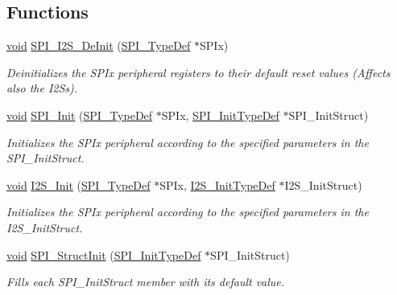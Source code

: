 \subsection*{Functions}
\begin{DoxyCompactItemize}
\item 
\hyperlink{usb__devapi_8h_afabf60e7f57651d6d595a02c75f07cd0}{void} \hyperlink{group___s_p_i___exported___functions_gabe36880945fa56785283a9c0092124cc}{S\+P\+I\+\_\+\+I2\+S\+\_\+\+De\+Init} (\hyperlink{struct_s_p_i___type_def}{S\+P\+I\+\_\+\+Type\+Def} $\ast$S\+P\+Ix)
\begin{DoxyCompactList}\small\item\em Deinitializes the S\+P\+Ix peripheral registers to their default reset values (Affects also the I2\+Ss). \end{DoxyCompactList}\item 
\hyperlink{usb__devapi_8h_afabf60e7f57651d6d595a02c75f07cd0}{void} \hyperlink{group___s_p_i___exported___functions_ga8dacc1dc48bf08c0f12da409f4889037}{S\+P\+I\+\_\+\+Init} (\hyperlink{struct_s_p_i___type_def}{S\+P\+I\+\_\+\+Type\+Def} $\ast$S\+P\+Ix, \hyperlink{struct_s_p_i___init_type_def}{S\+P\+I\+\_\+\+Init\+Type\+Def} $\ast$S\+P\+I\+\_\+\+Init\+Struct)
\begin{DoxyCompactList}\small\item\em Initializes the S\+P\+Ix peripheral according to the specified parameters in the S\+P\+I\+\_\+\+Init\+Struct. \end{DoxyCompactList}\item 
\hyperlink{usb__devapi_8h_afabf60e7f57651d6d595a02c75f07cd0}{void} \hyperlink{group___s_p_i___exported___functions_ga53661884ae4a9640df7cbc59187782f7}{I2\+S\+\_\+\+Init} (\hyperlink{struct_s_p_i___type_def}{S\+P\+I\+\_\+\+Type\+Def} $\ast$S\+P\+Ix, \hyperlink{struct_i2_s___init_type_def}{I2\+S\+\_\+\+Init\+Type\+Def} $\ast$I2\+S\+\_\+\+Init\+Struct)
\begin{DoxyCompactList}\small\item\em Initializes the S\+P\+Ix peripheral according to the specified parameters in the I2\+S\+\_\+\+Init\+Struct. \end{DoxyCompactList}\item 
\hyperlink{usb__devapi_8h_afabf60e7f57651d6d595a02c75f07cd0}{void} \hyperlink{group___s_p_i___exported___functions_ga9a0116f88cc2c4478c270f05608703f1}{S\+P\+I\+\_\+\+Struct\+Init} (\hyperlink{struct_s_p_i___init_type_def}{S\+P\+I\+\_\+\+Init\+Type\+Def} $\ast$S\+P\+I\+\_\+\+Init\+Struct)
\begin{DoxyCompactList}\small\item\em Fills each S\+P\+I\+\_\+\+Init\+Struct member with its default value. \end{DoxyCompactList}\item 

\end{DoxyCompactItemize}
